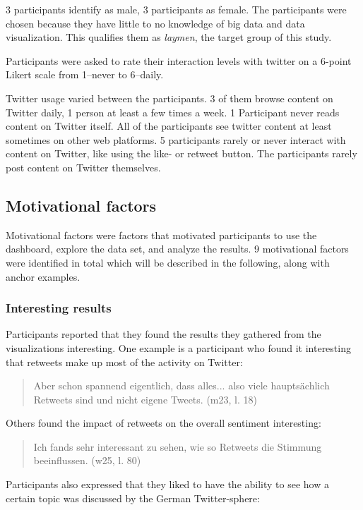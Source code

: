 
3 participants identify as male, 3 participants as female. The participants were chosen because they have little to no knowledge of big data and data visualization. This qualifies them as \emph{laymen}, the target group of this study.

Participants were asked to rate their interaction levels with twitter on a 6-point Likert scale from 1–never to 6–daily.

Twitter usage varied between the participants. 3 of them browse content on Twitter daily, 1 person at least a few times a week. 1 Participant never reads content on Twitter itself. All of the participants see twitter content at least sometimes on other web platforms. 5 participants rarely or never interact with content on Twitter, like using the like- or retweet button. The participants rarely post content on Twitter themselves.

\subsection{Motivational factors}
Motivational factors were factors that motivated participants to use the dashboard, explore the data set, and analyze the results. 9 motivational factors were identified in total which will be described in the following, along with anchor examples.

\subsubsection*{Interesting results}
Participants reported that they found the results they gathered from the visualizations interesting. One example is a participant who found it interesting that retweets make up most of the activity on Twitter:

\begin{quote}
    Aber schon spannend eigentlich, dass alles... also viele hauptsächlich Retweets sind und nicht eigene Tweets. (m23, l. 18)
\end{quote}

Others found the impact of retweets on the overall sentiment interesting:

\begin{quote}
    Ich fands sehr interessant zu sehen, wie so Retweets die Stimmung beeinflussen. (w25, l. 80)
\end{quote}

Participants also expressed that they liked to have the ability to see how a certain topic was discussed by the German Twitter-sphere:

